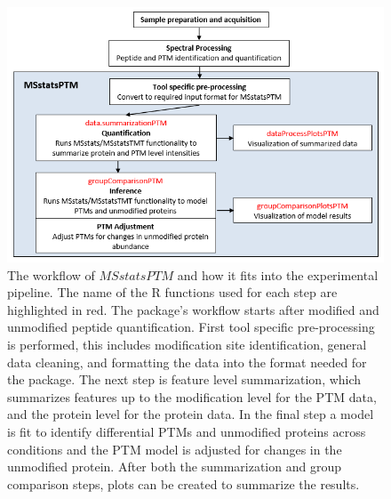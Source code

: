 \documentclass[mcp]{article}
\numberwithin{table}{section}
\begin{document}
\begin{figure}[ht]
\centering
\includegraphics[scale=.8]{images/MSstatsPTM_design.png}
\caption{The workflow of $MSstatsPTM$ and how it fits into the experimental pipeline. The name of the R functions used for each step are highlighted in red. The package's workflow starts after modified and unmodified peptide quantification. First tool specific pre-processing is performed, this includes modification site identification, general data cleaning, and formatting the data into the format needed for the package. The next step is feature level summarization, which summarizes features up to the modification level for the PTM data, and the protein level for the protein data. In the final step a model is fit to identify differential PTMs and unmodified proteins across conditions and the PTM model is adjusted for changes in the unmodified protein. After both the summarization and group comparison steps, plots can be created to summarize the results.}
\label{fig:msstatsptm_design}
\end{figure}
\end{document}
